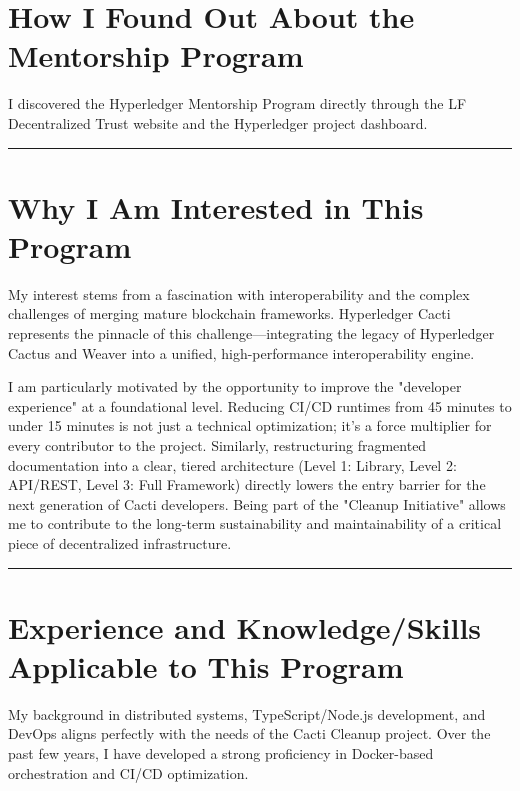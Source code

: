 \section*{How I Found Out About the Mentorship Program}

I discovered the Hyperledger Mentorship Program directly through the LF Decentralized Trust website and the Hyperledger project dashboard.

\begin{center}
    \textcolor{secondary}{\rule{0.7\textwidth}{0.3pt}}
\end{center}

\section*{Why I Am Interested in This Program}

My interest stems from a fascination with interoperability and the complex challenges of merging mature blockchain frameworks. Hyperledger Cacti represents the pinnacle of this challenge—integrating the legacy of Hyperledger Cactus and Weaver into a unified, high-performance interoperability engine. 

I am particularly motivated by the opportunity to improve the "developer experience" at a foundational level. Reducing CI/CD runtimes from 45 minutes to under 15 minutes is not just a technical optimization; it's a force multiplier for every contributor to the project. Similarly, restructuring fragmented documentation into a clear, tiered architecture (Level 1: Library, Level 2: API/REST, Level 3: Full Framework) directly lowers the entry barrier for the next generation of Cacti developers. Being part of the "Cleanup Initiative" allows me to contribute to the long-term sustainability and maintainability of a critical piece of decentralized infrastructure.

\begin{center}
    \textcolor{secondary}{\rule{0.7\textwidth}{0.3pt}}
\end{center}

\section*{Experience and Knowledge/Skills Applicable to This Program}

My background in distributed systems, TypeScript/Node.js development, and DevOps aligns perfectly with the needs of the Cacti Cleanup project. Over the past few years, I have developed a strong proficiency in Docker-based orchestration and CI/CD optimization.

